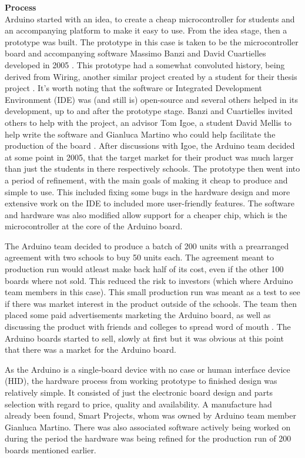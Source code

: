 \textbf{Process}\\
Arduino started with an idea, to create a cheap microcontroller for students and an accompanying platform to make it easy to use. From the idea stage, then a prototype was built. The prototype in this case is taken to be the microcontroller board and accompanying software Massimo Banzi and David Cuartielles developed in 2005 
\cite{RN111}. This prototype had a somewhat convoluted history, being derived from Wiring, another similar project created by a student for their thesis project 
\cite{RN110}\cite{RN111}. It's worth noting that the software or Integrated Development Environment (IDE) was (and still is) open-source and several others helped in its development, up to and after the prototype stage. Banzi and Cuartielles invited others to help with the project, an advisor Tom Igoe, a student David Mellis to help write the software and Gianluca Martino who could help facilitate the production of the board 
\cite{RN111}. After discussions with Igoe, the Arduino team decided at some point in 2005, that the target market for their product was much larger than just the students in there respectively schools. The prototype then went into a period of refinement, with the main goals of making it cheap to produce and simple to use. This included fixing some bugs in the hardware design 
\cite{RN111} and more extensive work on the IDE to included more user-friendly features. The software and hardware was also modified allow support for a cheaper chip, which is the microcontroller at the core of the Arduino board.

The Arduino team decided to produce a batch of 200 units with a prearranged agreement with two schools to buy 50 units each. The agreement meant to production run would atleast make back half of its cost, even if the other 100 boards where not sold. This reduced the risk to investors (which where Arduino team members in this case). This small production run was meant as a test to see if there was market interest in the product outside of the schools. The team then placed some paid advertisements marketing the Arduino board, as well as discussing the product with friends and colleges to spread word of mouth 
\cite{RN111}. The Arduino boards started to sell, slowly at first but it was obvious at this point that there was a market for the Arduino board.

As the Arduino is a single-board device with no case or human interface device (HID), the hardware process from working prototype to finished design was relatively simple. It consisted of just the electronic board design and parts selection with regard to price, quality and availability. A manufacture had already been found, Smart Projects, whom was owned by Arduino team member Gianluca Martino. There was also associated software actively being worked on during the period the hardware was being refined for the production run of 200 boards mentioned earlier.


